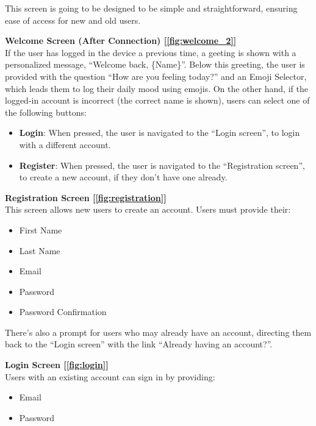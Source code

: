 \noindent This screen is going to be designed to be simple and straightforward, ensuring ease of access for new and old users.

\vspace{5mm}

\noindent \textbf{Welcome Screen (After Connection) [\ref{fig:welcome_2}]} \\
If the user has logged in the device a previous time, a geeting is shown with a personalized message, ``Welcome back, \{Name\}''. Below this greeting, the user is provided with the question ``How are you feeling today?'' and an Emoji Selector, which leads them to log their daily mood using emojis. On the other hand, if the logged-in account is incorrect (the correct name is shown), users can select one of the following buttons:
\begin{itemize}
    \item \textbf{Login}: When pressed, the user is navigated to the ``Login screen'', to login with a different account.
    \item \textbf{Register}: When pressed, the user is navigated to the ``Registration screen'', to create a new account, if they don't have one already.
\end{itemize}

\vspace{5mm}

\noindent \textbf{Registration Screen [\ref{fig:registration}]} \\
This screen allows new users to create an account. Users must provide their:
\begin{itemize}
    \item First Name
    \item Last Name
    \item Email
    \item Password
    \item Password Confirmation
\end{itemize}

\noindent There’s also a prompt for users who may already have an account, directing them back to the ``Login screen'' with the link ``Already having an account?''.

\vspace{5mm}

\noindent \textbf{Login Screen [\ref{fig:login}]} \\
Users with an existing account can sign in by providing:
\begin{itemize}
    \item Email
    \item Password
\end{itemize}

